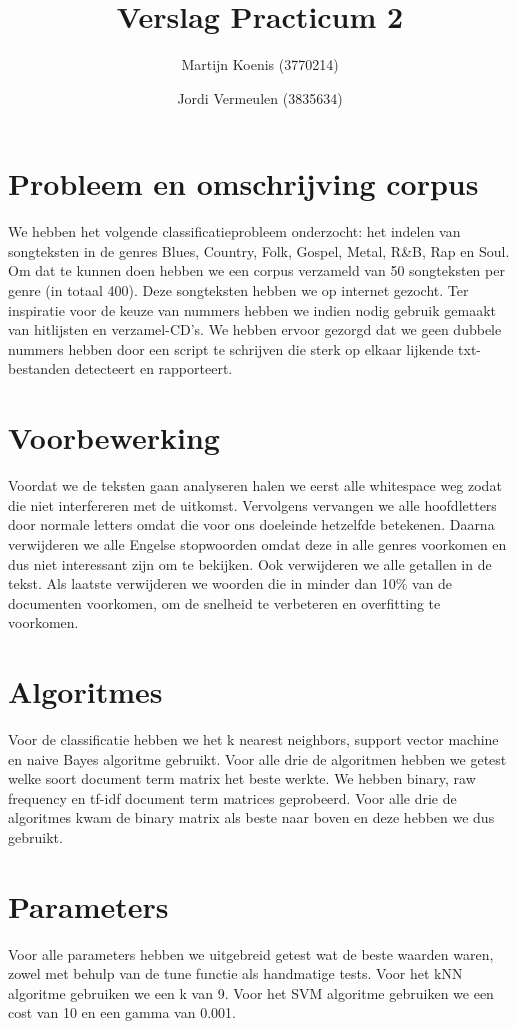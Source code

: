 \documentclass[a4paper,oneside]{article}
\begin{document}
\title{Verslag Practicum 2}
\author{Martijn Koenis (3770214) \and Jordi Vermeulen (3835634)}
\date{}
\maketitle
\tabulinesep=1.2mm

\section{Probleem en omschrijving corpus}
We hebben het volgende classificatieprobleem onderzocht: het indelen van songteksten in de genres Blues, Country, Folk, Gospel, Metal, R\&B, Rap en Soul.  Om dat te kunnen doen hebben we een corpus verzameld van 50 songteksten per genre (in totaal 400). Deze songteksten hebben we op internet gezocht. Ter inspiratie voor de keuze van nummers hebben we indien nodig gebruik gemaakt van hitlijsten en verzamel-CD's. We hebben ervoor gezorgd dat we geen dubbele nummers hebben door een script te schrijven die sterk op elkaar lijkende txt-bestanden detecteert en rapporteert.

\section{Voorbewerking}
Voordat we de teksten gaan analyseren halen we eerst alle whitespace weg zodat die niet interfereren met de uitkomst. Vervolgens vervangen we alle hoofdletters door normale letters omdat die voor ons doeleinde hetzelfde betekenen. Daarna verwijderen we alle Engelse stopwoorden omdat deze in alle genres voorkomen en dus niet interessant zijn om te bekijken. Ook verwijderen we alle getallen in de tekst. Als laatste verwijderen we woorden die in minder dan 10\% van de documenten voorkomen, om de snelheid te verbeteren en overfitting te voorkomen.

\section{Algoritmes}
Voor de classificatie hebben we het k nearest neighbors, support vector machine en naive Bayes algoritme gebruikt. Voor alle drie de algoritmen hebben we getest welke soort document term matrix het beste werkte. We hebben binary, raw frequency en tf-idf document term matrices geprobeerd. Voor alle drie de algoritmes kwam de binary matrix als beste naar boven en deze hebben we dus gebruikt.

\section{Parameters}
Voor alle parameters hebben we uitgebreid getest wat de beste waarden waren, zowel met behulp van de tune functie als handmatige tests. Voor het kNN algoritme gebruiken we een k van 9. Voor het SVM algoritme gebruiken we een cost van 10 en een gamma van 0.001.
\end{document}
